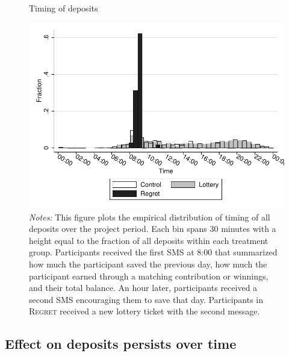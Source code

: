 \documentclass[11pt]{article}
\begin{document}
		\begin{figure}[ht]
		\centering
		\caption{Timing of deposits}
		\includegraphics[width=\textwidth]{../../figures/hist-deposits.pdf}
		\caption*{\footnotesize \emph{Notes:} This figure plots the empirical distribution of timing of all deposits over the project period. Each bin spans 30 minutes with a height equal to the fraction of all deposits within each treatment group. Participants received the first SMS at 8:00 that summarized how much the participant saved the previous day, how much the participant earned through a matching contribution or winnings, and their total balance. An hour later, participants received a second SMS encouraging them to save that day. Participants in \textsc{Regret} received a new lottery ticket with the second message.}
		\end{figure}


		\clearpage

	\subsection{Effect on deposits persists over time}

\end{document}
